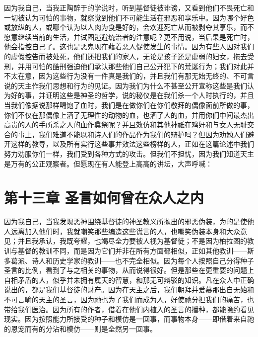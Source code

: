因为我自己，当我正陶醉于的学说时，听到基督徒被诽谤，又看到他们不畏死亡和一切被认为可怕的事物，就察觉到他们不可能生活在邪恶和享乐中。因为哪个好色或放纵的人，或哪个认为以人肉为食是好的，会欢迎死亡从而被剥夺其享乐，而不愿意继续当前的生活，并试图逃避统治者的注意呢？更不用说，当后果是死亡时，他会指控自己了。这也是恶鬼现在藉着恶人促使发生的事情。因为有些人因对我们的虚假控告而被处死，他们还把我们的家人，无论是孩子还是虚弱的妇女，拖去受刑，并用可怕的酷刑强迫他们承认那些他们自己公开犯下的荒诞行为；我们对此并不太在意，因为这些行为没有一件真是我们的，并且我们有那无始无终的、不可言说的天主作我们思想和行为的见证。因为我们为什么不甚至公开宣称这些是我们认为好的事，并证明这些是神圣的哲学，说的秘仪是在我们杀一个人时执行的，并且当我们像据说那样喝饱了血时，我们是在做你们在你们敬拜的偶像面前所做的事，你们不仅在那偶像上洒了无理性的动物的血，也洒了人的血，并用你们中间最杰出高贵的人的手所杀之人的血作奠祭呢？并且效仿和其他神祇在鸡奸和与女人无耻交合的事上，我们难道不能以和诗人们的作品作为我们的辩护吗？但因为劝勉人们避开这样的教导，以及所有实行这些事并效法这些榜样的人，正如在这篇论述中我们努力劝服你们一样，我们受到各种方式的攻击。但我们不担忧，因为我们知道天主是万有的公正观察者。但愿现在有人能登上高高的讲坛，大声呼喊：\par


\section{第十三章 圣言如何曾在众人之内}

因为我自己，当我发现恶神围绕基督徒的神圣教义所抛出的邪恶伪装，为的是使他人远离加入他们时，我就嘲笑那些编造这些谎言的人，也嘲笑伪装本身和大众意见；并且我承认，我既夸耀，也竭尽全力要被人视为基督徒；不是因为柏拉图的教训与基督的教训不同，而是因为它们并非在所有方面都相似，正如其他教训——斯多葛派、诗人和历史学家的教训——也不完全相似。因为每个人按照自己分得种子圣言的比例，看到了与之相关的事物，从而说得很好。但是那些在更重要的问题上自相矛盾的人，似乎并未拥有属天的智慧，和那无可辩驳的知识。凡在众人中正确说出的，都是我们基督徒的财产。因为在天主之后，我们朝拜并爱慕那出自无始和不可言喻的天主的圣言，因为祂也为了我们而成为人，好使祂分担我们的痛苦，也带给我们医治。因为所有的作者，借着在他们内植入的圣言的播种，都能隐约看见现实。因为按照能力所接受的种子和模仿是一回事，而事物本身——即借着来自祂的恩宠而有的分沾和模仿——则是全然另一回事。\par

